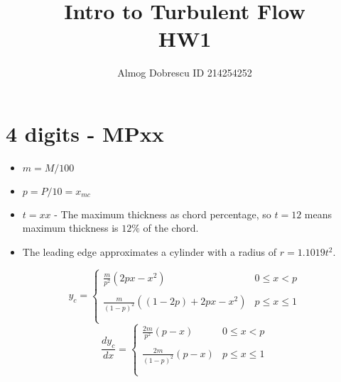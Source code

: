 \documentclass[11pt, a4paper]{article}
\title{Intro to Turbulent Flow \\ HW1}
\author{Almog Dobrescu ID 214254252}
\begin{document}


\vfil
\tableofcontents
\vfil
\lstlistoflistings
\newpage


\pagestyle{fancy}
\setcounter{page}{1}

\section{4 digits - MPxx}
\begin{itemize}
    \item $m=M/100$
    \item $p=P/10=x_{mc}$
    \item $t=xx$ - The maximum thickness as chord percentage, so $t=12$ means maximum thickness is $12\%$ of the chord.
    \item The leading edge approximates a cylinder with a radius of $r=1.1019t^2$.
\end{itemize}
\begin{equation}
    y_c=\left\{\begin{array}{cc}
        \displaystyle \frac{m}{p^2}\left(2px-x^2\right) & 0\le x<p \\\\
        \displaystyle \frac{m}{\left(1-p\right)^2}\left(\left(1-2p\right)+2px-x^2\right) & p\le x\le 1 \\\\
    \end{array}\right.
\end{equation}
\begin{equation}
    \frac{dy_c}{dx}=\left\{\begin{array}{cc}
        \displaystyle \frac{2m}{p^2}\left(p-x\right) & 0\le x<p \\\\
        \displaystyle \frac{2m}{\left(1-p\right)^2}\left(p-x\right) & p\le x\le 1 \\\\
    \end{array}\right.
\end{equation}
\end{document}
